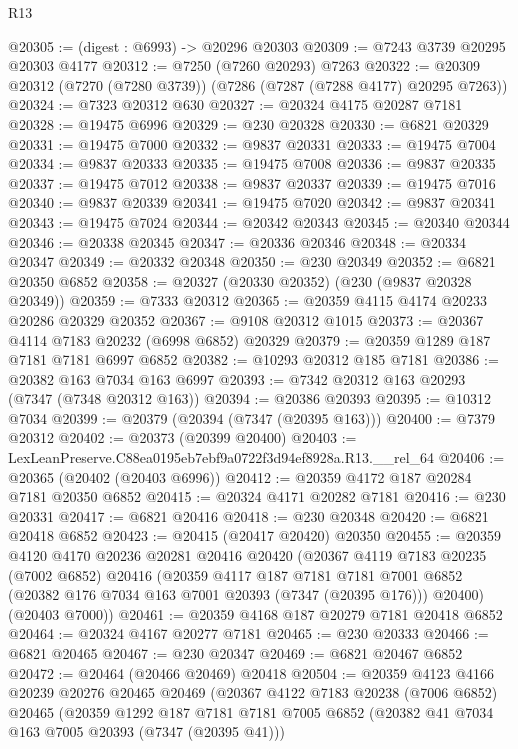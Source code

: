 \begin{lexlean}{R13}
\begin{coremodule}
@20305 := (digest : @6993) -> @20296 @20303
@20309 := @7243 @3739 @20295 @20303 @4177
@20312 := @7250 (@7260 @20293) @7263
@20322 := @20309 @20312 (@7270 (@7280 @3739)) (@7286 (@7287 (@7288 @4177) @20295 @7263))
@20324 := @7323 @20312 @630
@20327 := @20324 @4175 @20287 @7181
@20328 := @19475 @6996
@20329 := @230 @20328
@20330 := @6821 @20329
@20331 := @19475 @7000
@20332 := @9837 @20331
@20333 := @19475 @7004
@20334 := @9837 @20333
@20335 := @19475 @7008
@20336 := @9837 @20335
@20337 := @19475 @7012
@20338 := @9837 @20337
@20339 := @19475 @7016
@20340 := @9837 @20339
@20341 := @19475 @7020
@20342 := @9837 @20341
@20343 := @19475 @7024
@20344 := @20342 @20343
@20345 := @20340 @20344
@20346 := @20338 @20345
@20347 := @20336 @20346
@20348 := @20334 @20347
@20349 := @20332 @20348
@20350 := @230 @20349
@20352 := @6821 @20350 @6852
@20358 := @20327 (@20330 @20352) (@230 (@9837 @20328 @20349))
@20359 := @7333 @20312
@20365 := @20359 @4115 @4174 @20233 @20286 @20329 @20352
@20367 := @9108 @20312 @1015
@20373 := @20367 @4114 @7183 @20232 (@6998 @6852) @20329
@20379 := @20359 @1289 @187 @7181 @7181 @6997 @6852
@20382 := @10293 @20312 @185 @7181
@20386 := @20382 @163 @7034 @163 @6997
@20393 := @7342 @20312 @163 @20293 (@7347 (@7348 @20312 @163))
@20394 := @20386 @20393
@20395 := @10312 @7034
@20399 := @20379 (@20394 (@7347 (@20395 @163)))
@20400 := @7379 @20312
@20402 := @20373 (@20399 @20400)
@20403 := LexLeanPreserve.C88ea0195eb7ebf9a0722f3d94ef8928a.R13.__rel_64
@20406 := @20365 (@20402 (@20403 @6996))
@20412 := @20359 @4172 @187 @20284 @7181 @20350 @6852
@20415 := @20324 @4171 @20282 @7181
@20416 := @230 @20331
@20417 := @6821 @20416
@20418 := @230 @20348
@20420 := @6821 @20418 @6852
@20423 := @20415 (@20417 @20420) @20350
@20455 := @20359
    @4120
    @4170
    @20236
    @20281
    @20416
    @20420
    (@20367
      @4119
      @7183
      @20235
      (@7002 @6852)
      @20416
      (@20359
        @4117
        @187
        @7181
        @7181
        @7001
        @6852
        (@20382 @176 @7034 @163 @7001 @20393 (@7347 (@20395 @176)))
        @20400)
      (@20403 @7000))
@20461 := @20359 @4168 @187 @20279 @7181 @20418 @6852
@20464 := @20324 @4167 @20277 @7181
@20465 := @230 @20333
@20466 := @6821 @20465
@20467 := @230 @20347
@20469 := @6821 @20467 @6852
@20472 := @20464 (@20466 @20469) @20418
@20504 := @20359
    @4123
    @4166
    @20239
    @20276
    @20465
    @20469
    (@20367
      @4122
      @7183
      @20238
      (@7006 @6852)
      @20465
      (@20359
        @1292
        @187
        @7181
        @7181
        @7005
        @6852
        (@20382 @41 @7034 @163 @7005 @20393 (@7347 (@20395 @41)))

\end{coremodule}
\end{lexlean}
